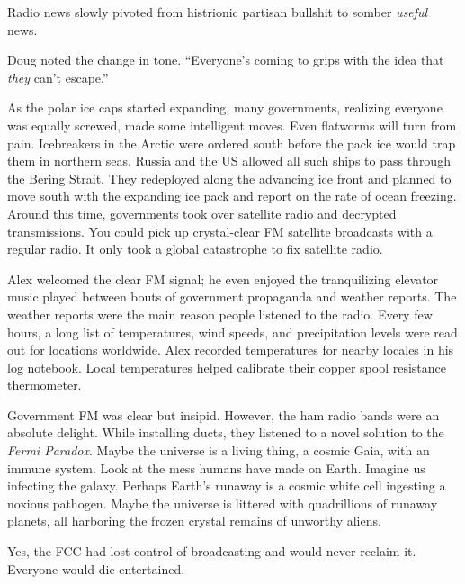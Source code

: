 Radio news slowly pivoted from histrionic partisan bullshit to somber
\emph{useful} news.

Doug noted the change in tone. ``Everyone's coming to grips with the
idea that \emph{they} can't escape.''

As the polar ice caps started expanding, many governments, realizing
everyone was equally screwed, made some intelligent moves. Even
flatworms will turn from pain. Icebreakers in the Arctic were ordered
south before the pack ice would trap them in northern seas. Russia and
the US allowed all such ships to pass through the Bering Strait. They
redeployed along the advancing ice front and planned to move south with
the expanding ice pack and report on the rate of ocean freezing. Around
this time, governments took over satellite radio and decrypted
transmissions. You could pick up crystal-clear FM satellite broadcasts
with a regular radio. It only took a global catastrophe to fix satellite
radio.

Alex welcomed the clear FM signal; he even enjoyed the tranquilizing
elevator music played between bouts of government propaganda and weather
reports. The weather reports were the main reason people listened to the
radio. Every few hours, a long list of temperatures, wind speeds, and
precipitation levels were read out for locations worldwide. Alex
recorded temperatures for nearby locales in his log notebook. Local
temperatures helped calibrate their copper spool resistance thermometer.

Government FM was clear but insipid. However, the ham radio bands were
an absolute delight. While installing ducts, they listened to a novel
solution to the \emph{Fermi Paradox}. Maybe the universe is a living
thing, a cosmic Gaia, with an immune system. Look at the mess humans
have made on Earth. Imagine us infecting the galaxy. Perhaps Earth's
runaway is a cosmic white cell ingesting a noxious pathogen. Maybe the
universe is littered with quadrillions of runaway planets, all harboring
the frozen crystal remains of unworthy aliens.

Yes, the FCC had lost control of broadcasting and would never reclaim
it. Everyone would die entertained.


%

